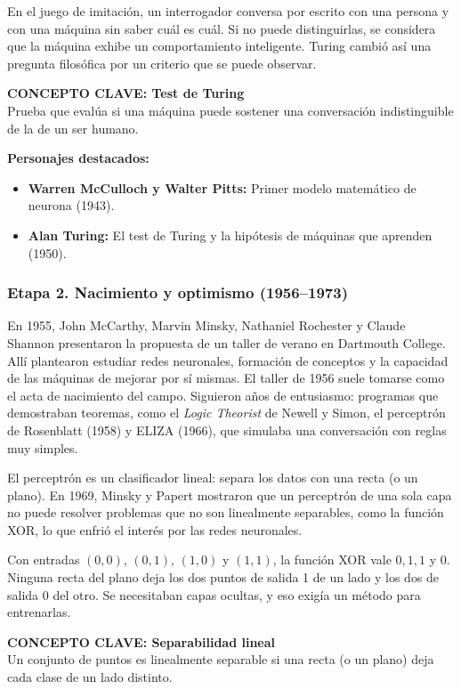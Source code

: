 En el juego de imitación, un interrogador conversa por escrito con una persona y con una máquina sin saber cuál es cuál. Si no puede distinguirlas, se considera que la máquina exhibe un comportamiento inteligente. Turing cambió así una pregunta filosófica por un criterio que se puede observar.

\begin{cajabeige}
\textbf{CONCEPTO CLAVE: Test de Turing}\\
Prueba que evalúa si una máquina puede sostener una conversación indistinguible de la de un ser humano.
\end{cajabeige}

\textbf{Personajes destacados:}
\begin{itemize}
    \item \textbf{Warren McCulloch y Walter Pitts:} Primer modelo matemático de neurona (1943).
    \item \textbf{Alan Turing:} El test de Turing y la hipótesis de máquinas que aprenden (1950).
\end{itemize}

\subsubsection{Etapa 2. Nacimiento y optimismo (1956--1973)}
En 1955, John McCarthy, Marvin Minsky, Nathaniel Rochester y Claude Shannon presentaron la propuesta de un taller de verano en Dartmouth College. Allí plantearon estudiar redes neuronales, formación de conceptos y la capacidad de las máquinas de mejorar por sí mismas. El taller de 1956 suele tomarse como el acta de nacimiento del campo. Siguieron años de entusiasmo: programas que demostraban teoremas, como el \textit{Logic Theorist} de Newell y Simon, el perceptrón de Rosenblatt (1958) y ELIZA (1966), que simulaba una conversación con reglas muy simples.

El perceptrón es un clasificador lineal: separa los datos con una recta (o un plano). En 1969, Minsky y Papert mostraron que un perceptrón de una sola capa no puede resolver problemas que no son linealmente separables, como la función XOR, lo que enfrió el interés por las redes neuronales.

Con entradas $(0,0)$, $(0,1)$, $(1,0)$ y $(1,1)$, la función XOR vale $0, 1, 1$ y $0$. Ninguna recta del plano deja los dos puntos de salida 1 de un lado y los dos de salida 0 del otro. Se necesitaban capas ocultas, y eso exigía un método para entrenarlas.

\begin{cajagris}
\textbf{CONCEPTO CLAVE: Separabilidad lineal}\\
Un conjunto de puntos es linealmente separable si una recta (o un plano) deja cada clase de un lado distinto.
\end{cajagris}

